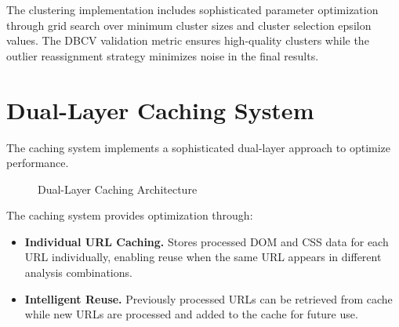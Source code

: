 The clustering implementation includes sophisticated parameter optimization through grid search over minimum cluster sizes and cluster selection epsilon values. The DBCV validation metric ensures high-quality clusters while the outlier reassignment strategy minimizes noise in the final results.

\section{Dual-Layer Caching System}
\label{sec:caching_system}

The caching system implements a sophisticated dual-layer approach to optimize performance.

\begin{figure}[h]
\centering
{}
\caption{Dual-Layer Caching Architecture}
\label{fig:cache_architecture}
\end{figure}

The caching system provides optimization through:

\begin{itemize}
\item \textbf{Individual URL Caching.} Stores processed DOM and CSS data for each URL individually, enabling reuse when the same URL appears in different analysis combinations.
\item \textbf{Intelligent Reuse.} Previously processed URLs can be retrieved from cache while new URLs are processed and added to the cache for future use.
\end{itemize}

